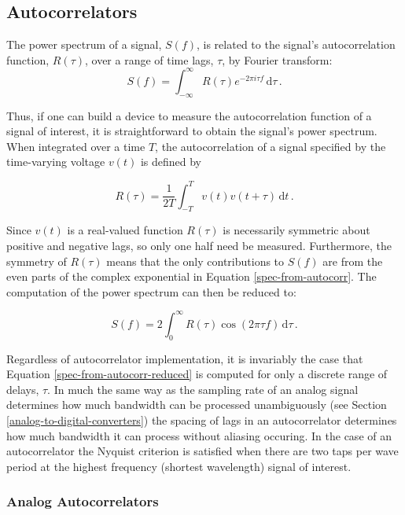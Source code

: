 \documentclass{ws-rv961x669}
\begin{document}
\subsection{Autocorrelators}\label{autocorrelators}
The power spectrum of a signal, $S(f)$,  is related to the signal's autocorrelation function, $R(\tau)$, over a range of time lags, $\tau$, by Fourier transform:
\begin{equation}
\label{spec-from-autocorr}
 S(f) = \int_{-\infty}^{\infty} R(\tau)e^{-2\pi i \tau f} \,\mathrm{d}\tau \,.
\end{equation}

Thus, if one can build a device to measure the autocorrelation function of a signal of interest, it is straightforward to obtain the signal's power spectrum.
When integrated over a time $T$, the autocorrelation of a signal specified by the time-varying voltage $v(t)$ is defined by 

\begin{equation}
\label{autocorr}
 R(\tau) = \frac{1}{2T} \int_{-T}^{T} v(t)v(t+\tau) \,\mathrm{d}t \,.
\end{equation}

Since $v(t)$ is a real-valued function $R(\tau)$ is necessarily symmetric about positive and negative lags, so only one half need be measured. Furthermore, the symmetry of $R(\tau)$ means that the only contributions to $S(f)$ are from the even parts of the complex exponential in Equation \ref{spec-from-autocorr}. The computation of the power spectrum can then be reduced to:

\begin{equation}
\label{spec-from-autocorr-reduced}
 S(f) = 2\int_{0}^{\infty} R(\tau)\cos{(2\pi \tau f)} \,\mathrm{d}\tau \,.
\end{equation}

Regardless of autocorrelator implementation, it is invariably the case that Equation \ref{spec-from-autocorr-reduced} is computed for only a discrete range of delays, $\tau$. In much the same way as the sampling rate of an analog signal determines how much bandwidth can be processed unambiguously (see Section \ref{analog-to-digital-converters}) the spacing of lags in an autocorrelator determines how much bandwidth it can process without aliasing occuring. In the case of an autocorrelator the Nyquist criterion is satisfied when there are two taps per wave period at the highest frequency (shortest wavelength) signal of interest. 


\subsubsection{Analog Autocorrelators}\label{analog-autocorrelators}
\end{document}
